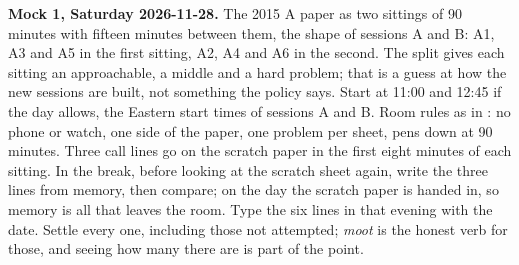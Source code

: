 \textbf{Mock 1, Saturday 2026-11-28.} The 2015 A paper as two sittings of 90 minutes with fifteen minutes between them, the shape of sessions A and B: A1, A3 and A5 in the first sitting, A2, A4 and A6 in the second. The split gives each sitting an approachable, a middle and a hard problem; that is a guess at how the new sessions are built, not something the policy says. Start at 11:00 and 12:45 if the day allows, the Eastern start times of sessions A and B. Room rules as in : no phone or watch, one side of the paper, one problem per sheet, pens down at 90 minutes. Three call lines go on the scratch paper in the first eight minutes of each sitting. In the break, before looking at the scratch sheet again, write the three lines from memory, then compare; on the day the scratch paper is handed in, so memory is all that leaves the room. Type the six lines in that evening with the date. Settle every one, including those not attempted; \emph{moot} is the honest verb for those, and seeing how many there are is part of the point.
